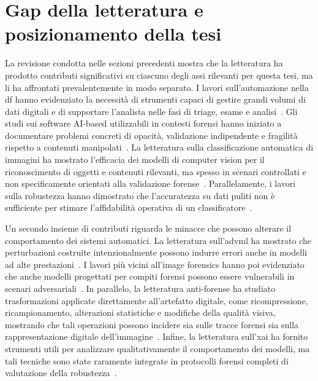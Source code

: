 \section{Gap della letteratura e posizionamento della tesi}
\label{sec:sota-gap}

La revisione condotta nelle sezioni precedenti mostra che la letteratura ha prodotto contributi significativi su ciascuno degli assi rilevanti per questa tesi, ma li ha affrontati prevalentemente in modo separato. I lavori sull'automazione nella \gls{df} hanno evidenziato la necessità di strumenti capaci di gestire grandi volumi di dati digitali e di supportare l'analista nelle fasi di triage, esame e analisi~\cite{garfinkel2010digital,costantini2019digital,faqir2023digital}. Gli studi sui software AI-based utilizzabili in contesti forensi hanno iniziato a documentare problemi concreti di opacità, validazione indipendente e fragilità rispetto a contenuti manipolati~\cite{sanna2024preliminary,sanna2025pixelperfect}. La letteratura sulla classificazione automatica di immagini ha mostrato l'efficacia dei modelli di computer vision per il riconoscimento di oggetti e contenuti rilevanti, ma spesso in scenari controllati e non specificamente orientati alla validazione forense~\cite{Hao2018DeepFirearm,he2016deep,tan2019efficientnet,radford2021learning,li2022blip}. Parallelamente, i lavori sulla robustezza hanno dimostrato che l'accuratezza su dati puliti non è sufficiente per stimare l'affidabilità operativa di un classificatore~\cite{hendrycks2019benchmarking,hendrycks2017baseline,fort2021exploring,croce2020robustbench}.

Un secondo insieme di contributi riguarda le minacce che possono alterare il comportamento dei sistemi automatici. La letteratura sull'\gls{advml} ha mostrato che perturbazioni costruite intenzionalmente possono indurre errori anche in modelli ad alte prestazioni~\cite{szegedy2014intriguing,goodfellow2015explaining,papernot2016limitations,carlini2017towards,biggio2018wild}. I lavori più vicini all'image forensics hanno poi evidenziato che anche modelli progettati per compiti forensi possono essere vulnerabili in scenari adversariali~\cite{barni2018cf,nowroozi2020phd}. In parallelo, la letteratura anti-forense ha studiato trasformazioni applicate direttamente all'artefatto digitale, come ricompressione, ricampionamento, alterazioni statistiche e modifiche della qualità visiva, mostrando che tali operazioni possono incidere sia sulle tracce forensi sia sulla rappresentazione digitale dell'immagine~\cite{stamm2010anti,stamm2013information,farid2016photo,popescu2005exposing}. Infine, la letteratura sull'\gls{xai} ha fornito strumenti utili per analizzare qualitativamente il comportamento dei modelli, ma tali tecniche sono state raramente integrate in protocolli forensi completi di valutazione della robustezza~\cite{Adadi2018,Doshi-Velez2017,Ribeiro2016,Sundararajan2017,Zhou2016}.

